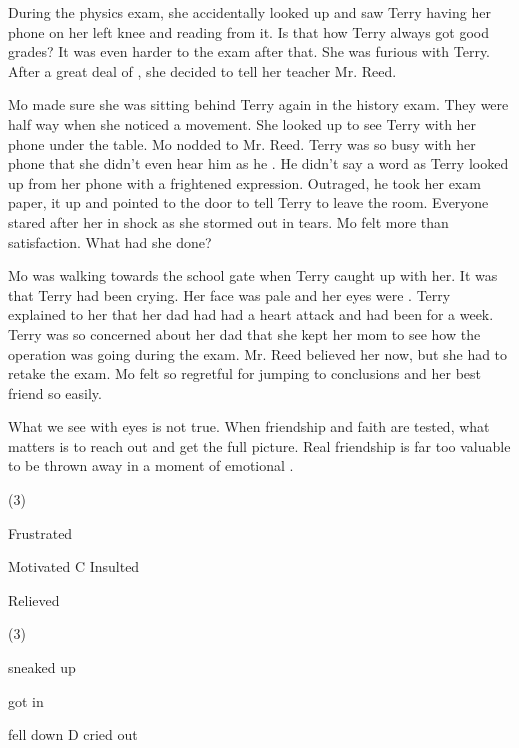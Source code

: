 \documentclass{英语试卷}
\begin{document}
\par During the physics exam, she accidentally looked up and saw Terry having her phone on her left knee and reading from it. Is that how Terry always got good grades? It was even harder to  the exam after that. She was furious with Terry. After a great deal of , she decided to tell her teacher Mr. Reed.\par
\par Mo made sure she was sitting behind Terry again in the history exam. They were half way  when she noticed a movement. She looked up to see Terry with her phone under the table. Mo nodded to Mr. Reed. Terry was so busy with her phone that she didn't even hear him as he . He didn't say a word as Terry looked up from her phone with a frightened expression. Outraged, he took her exam paper,  it up and pointed to the door to tell Terry to leave the room. Everyone stared after her in shock as she stormed out in tears. Mo felt more  than satisfaction. What had she done?\par
\par Mo was walking towards the school gate when Terry caught up with her. It was  that Terry had been crying. Her face was pale and her eyes were . Terry explained to her that her dad had had a heart attack and had been  for a week. Terry was so concerned about her dad that she kept  her mom to see how the operation was going during the exam. Mr. Reed believed her now, but she had to retake the exam. Mo felt so regretful for jumping to conclusions and  her best friend so easily.\par
\par What we see with eyes is not  true. When friendship and faith are tested, what matters is to reach out and get the full picture. Real friendship is far too valuable to be thrown away in a moment of emotional .\par
{}
\begin{choices}(3)
  \item Frustrated
  \item Motivated C Insulted
  \item Relieved
\end{choices}
\begin{choices}(3)
  \item sneaked up
  \item got in
  \item fell down D cried out
\end{choices}
\end{document}
